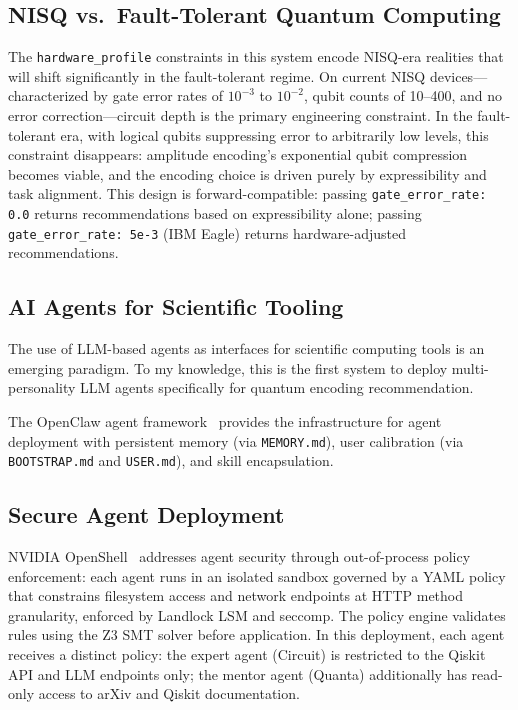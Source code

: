 \documentclass[sigconf,nonacm]{acmart}
\begin{document}
\subsection{NISQ vs.\ Fault-Tolerant Quantum Computing}

The \texttt{hardware\_profile} constraints in this system encode NISQ-era realities
that will shift significantly in the fault-tolerant regime. On current NISQ
devices---characterized by gate error rates of $10^{-3}$ to $10^{-2}$, qubit counts
of 10--400, and no error correction---circuit depth is the primary engineering
constraint. In the fault-tolerant era, with logical qubits suppressing error to
arbitrarily low levels, this constraint disappears: amplitude encoding's exponential
qubit compression becomes viable, and the encoding choice is driven purely by
expressibility and task alignment. This design is forward-compatible: passing
\texttt{gate\_error\_rate: 0.0} returns recommendations based on expressibility
alone; passing \texttt{gate\_error\_rate: 5e-3} (IBM Eagle) returns
hardware-adjusted recommendations.

\subsection{AI Agents for Scientific Tooling}

The use of LLM-based agents as interfaces for scientific computing tools is an
emerging paradigm. To my knowledge, this is the first system to deploy
multi-personality LLM agents specifically for quantum encoding recommendation.

The OpenClaw agent framework~\cite{openclaw2026} provides the infrastructure for
agent deployment with persistent memory (via \texttt{MEMORY.md}), user calibration
(via \texttt{BOOTSTRAP.md} and \texttt{USER.md}), and skill encapsulation.

\subsection{Secure Agent Deployment}

NVIDIA OpenShell~\cite{nvidia2026} addresses agent security through out-of-process
policy enforcement: each agent runs in an isolated sandbox governed by a YAML policy
that constrains filesystem access and network endpoints at HTTP method granularity,
enforced by Landlock LSM and seccomp. The policy engine validates rules using the Z3
SMT solver before application. In this deployment, each agent receives a distinct
policy: the expert agent (Circuit) is restricted to the Qiskit API and LLM endpoints
only; the mentor agent (Quanta) additionally has read-only access to arXiv and Qiskit
documentation.
\end{document}
